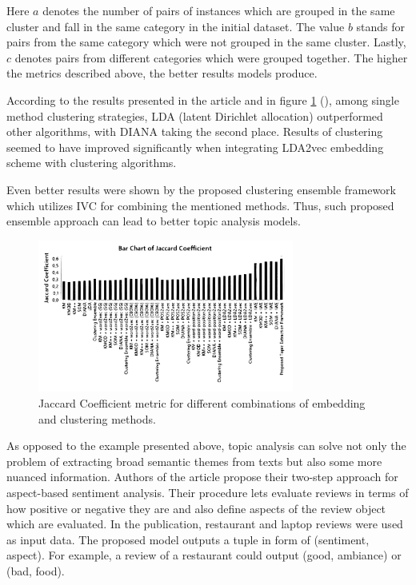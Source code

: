 \documentclass[13pt, a4paper]{article}
\begin{document}
Here $a$ denotes the number of pairs of instances which are grouped in the same cluster and fall in the same category in the initial dataset. The value $b$ stands for pairs from the same category which were not grouped in the same cluster. Lastly, $c$ denotes pairs from different categories which were grouped together. The higher the metrics described above, the better results models produce.

According to the results presented in the article and in figure \ref{fig:gr1} (\cite{onan2019two}), among single method clustering strategies, LDA (latent Dirichlet allocation) outperformed other algorithms, with DIANA taking the second place. Results of clustering seemed to have improved significantly when integrating LDA2vec embedding scheme with clustering algorithms.

Even better results were shown by the proposed clustering ensemble framework which utilizes IVC for combining the mentioned methods. Thus, such proposed ensemble approach can lead to better topic analysis models.

\begin{figure}[!h]\vspace*{4pt}
	\centerline{\includegraphics[width=0.75\textwidth]{./visuals/gr1.pdf}}
\caption{Jaccard Coefficient metric for different combinations of embedding and clustering methods.}
\label{fig:gr1}
\end{figure}

As opposed to the example presented above, topic analysis can solve not only the problem of extracting broad semantic themes from texts but also some more nuanced information. Authors of the article \cite{huang2020weakly} propose their two-step approach for aspect-based sentiment analysis. Their procedure lets evaluate reviews in terms of how positive or negative they are and also define aspects of the review object which are evaluated. In the publication, restaurant and laptop reviews were used as input data. The proposed model outputs a tuple in form of (sentiment, aspect). For example, a review of a restaurant could output (good, ambiance) or (bad, food).
\end{document}
